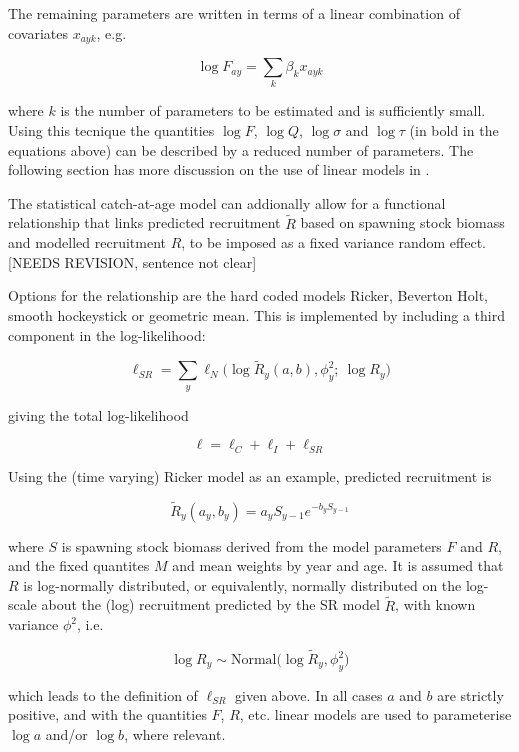 \documentclass[a4paper,english,11pt]{article}
\begin{document}

The remaining parameters are written in terms of a linear combination of covariates $x_{ayk}$, e.g.

$$\log F_{ay} = \sum_k \beta_k x_{ayk}$$

where $k$ is the number of parameters to be estimated and is sufficiently small. Using this tecnique the quantities $\log F$, $\log Q$, $\log \sigma$ and $\log \tau$
(in bold in the equations above) can be described by a reduced number of parameters. The following section has more discussion on the use of linear models in \aFa.


The \aFa statistical catch-at-age model can addionally allow for a functional relationship that links predicted recruitment $\tilde{R}$ based on spawning stock biomass and modelled recruitment $R$, to be imposed as a fixed variance random effect. [NEEDS REVISION, sentence not clear]

Options for the relationship are the hard coded models Ricker, Beverton Holt, smooth hockeystick or geometric mean. This is implemented by including a third component in the log-likelihood:

$$\ell_{SR} = \sum_y \ell_N \Big( \log \tilde{R}_y(a, b), \phi_y^2 ;\ \log R_y \Big)$$

giving the total log-likelihood

$$\ell = \ell_C + \ell_I + \ell_{SR}$$

Using the (time varying) Ricker model as an example, predicted recruitment is

$$\tilde{R}_y(a_y,b_y) = a_y S_{y-1} e^{-b_y S_{y-1}}$$

where $S$ is spawning stock biomass derived from the model parameters $F$ and $R$, and the fixed quantites $M$ and mean weights by year and age. It is assumed that $R$ is log-normally distributed, or equivalently, normally distributed on the log-scale about the (log) recruitment predicted by the SR model $\tilde{R}$, with known variance $\phi^2$, i.e.

$$\log R_y \sim \text{Normal} \Big( \log \tilde{R}_y, \phi_y^2 \Big)$$

which leads to the definition of $\ell_{SR}$ given above. In all cases $a$ and $b$ are strictly positive, and with the quantities $F$, $R$, etc. linear models are used to parameterise $\log a$ and/or $\log b$, where relevant.
\end{document}

